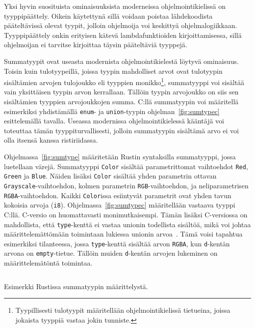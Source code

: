 Yksi hyvin suosituista ominaisuuksista moderneissa ohjelmointikielissä on
tyyppipäättely. Oikein käytettynä sillä voidaan poistaa lähdekoodista
pääteltävissä olevat tyypit, jolloin ohjelmoija voi keskittyä
ohjelmalogiikkaan. Tyyppipäättely onkin erityisen kätevä lambdafunktioiden
kirjoittamisessa, sillä ohjelmoijan ei tarvitse kirjoittaa täysin pääteltäviä
tyyppejä.

Summatyypit ovat useasta modernista
ohjelmointikielestä löytyvä ominaisuus. Toisin kuin
tulotyypeillä, joissa tyypin mahdolliset arvot ovat
tulotyypin sisältämien arvojen tulojoukko eli tyyppien
monikko\footnote{Tyypillisesti tulotyypit määritellään ohjelmointikielissä
tietueina, joissa jokaista tyyppiä vastaa jokin tunniste.},
summatyyppi voi sisältää vain yksittäisen tyypin arvon kerrallaan. Tällöin
tyypin arvojoukko on siis sen sisältämien tyyppien arvojoukkojen summa. C:llä
summatyypin voi määritellä esimerkiksi yhdistämällä \texttt{enum}- ja
\texttt{union}-tyypin ohjelman~\ref{fig:sumtypec} esittelemällä tavalla.
Useassa modernissa ohjelmointikielessä kääntäjä voi toteuttaa tämän
tyyppiturvallisesti, jolloin summatyypin sisältämä arvo ei voi olla itsensä
kanssa ristiriidassa.

Ohjelmassa~\ref{fig:sumtype} määritetään Rustin syntaksilla summatyyppi, jossa
luetellaan värejä. Summatyyppi \texttt{Color} sisältää parametrittomat
vaihtoehdot \texttt{Red}, \texttt{Green} ja \texttt{Blue}. Näiden lisäksi
\texttt{Color} sisältää yhden parametrin ottavan
\texttt{Grayscale}-vaihtoehdon, kolmen parametrin \texttt{RGB}-vaihtoehdon, ja
neliparametrisen \texttt{RGBA}-vaihtoehdon. Kaikki \texttt{Color}issa
esiintyvät parametrit ovat yhden tavun kokoisia arvoja (\texttt{i8}).
Ohjelmassa~\ref{fig:sumtypec} määritellään vastaava tyyppi C:llä. C-versio on
huomattavasti monimutkaisempi. Tämän lisäksi C-versiossa on mahdollista, että
\texttt{type}-kenttä ei vastaa unionin todellista sisältöä, mikä voi johtaa
määrittelemättömään toimintaan lukiessa unionin arvoa~\citep[luku
6.7.2.1]{C18}. Tämä voisi tapahtua esimerkiksi tilanteessa, jossa
\texttt{type}-kenttä sisältää arvon \texttt{RGBA}, kun \texttt{d}-kentän arvona
on \texttt{empty}-tietue. Tällöin muiden \texttt{d}-kentän arvojen lukeminen on
määrittelemätöntä toimintaa.

\FloatBarrier

\begin{listing}[ht!]
    \inputminted{Rust}{sumtype.rs}
    \caption{Esimerkki Rustissa summatyypin määrittelystä.}
    \label{fig:sumtype}
\end{listing}

